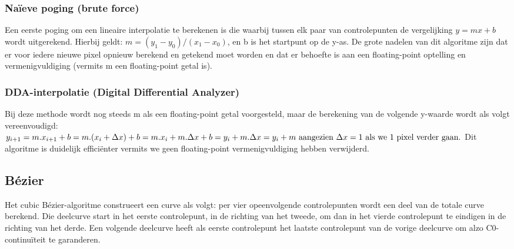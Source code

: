 \documentclass[a4paper,11pt,oneside, titlepage]{article}
\begin{document}
\subsubsection{Na\"ieve poging (brute force)}
Een eerste poging om een lineaire interpolatie te berekenen is die waarbij tussen elk paar van controlepunten
de vergelijking \begin{math}y = mx + b\end{math} wordt uitgerekend.
Hierbij geldt: \begin{math}m = (y_1-y_0)/(x_1-x_0)\end{math}, en b is het
startpunt op de y-as. De grote nadelen van dit algoritme zijn dat er voor iedere nieuwe
pixel opnieuw berekend en getekend moet worden en dat er behoefte is aan een floating-point optelling en 
vermenigvuldiging (vermits m een floating-point getal is).
\subsubsection{DDA-interpolatie (Digital Differential Analyzer)}
Bij deze methode wordt nog steeds m als een floating-point getal voorgesteld, maar de berekening van
de volgende y-waarde wordt als volgt vereenvoudigd:
\begin{math}
y_{i+1} = m.x_{i+1} + b\newline
= m.(x_i + \Delta x) + b\newline
= m.x_i + m.\Delta x + b\newline
= y_i + m.\Delta x\newline
= y_i + m \textrm{ aangezien } \Delta x = 1 \textrm{ als we 1 pixel verder gaan.} \newline
\end{math}
Dit algoritme is duidelijk effici\"enter vermits we geen floating-point vermenigvuldiging hebben 
verwijderd. 
\subsection{B\'ezier}
Het cubic Bézier-algoritme construeert een curve als volgt: per vier opeenvolgende controlepunten wordt een deel van de totale curve berekend.
Die deelcurve start in het eerste controlepunt, in de richting van het tweede, om dan in het vierde controlepunt te eindigen in de richting van het derde. Een volgende 
deelcurve heeft als eerste controlepunt het laatste controlepunt van de vorige deelcurve om alzo C0-continu\"iteit te garanderen.
\end{document}
